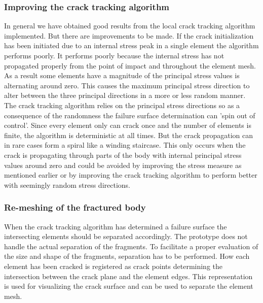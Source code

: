 \subsubsection*{Improving the crack tracking algorithm}
In general we have obtained good results from the local crack
tracking algorithm implemented. But there are improvements to be
made. If the crack initialization has been initiated due to an
internal stress peak in a single element the algorithm performs
poorly.
%
It performs poorly because the internal stress has not propagated
properly from the point of impact and throughout the element mesh.
As a result some elements have a magnitude of the principal stress values is
alternating around zero. This causes the maximum principal stress
direction to alter between the three principal directions in a more or
less random manner.
%
The crack tracking algorithm relies on the principal stress directions
so as a consequence of the randomness the failure surface
determination can 'spin out of control'. Since every element only can
crack once and the number of elements is finite, the algorithm is
deterministic at all times. But the crack propagation can in rare
cases form a spiral like a winding staircase. This only occurs when
the crack is propagating through parts of the body with internal
principal stress values around zero and could be avoided by improving
the stress measure as mentioned earlier or by improving the crack
tracking algorithm to perform better with seemingly random stress
directions.

\subsubsection*{Re-meshing of the fractured body}
When the crack tracking algorithm has determined a failure surface the
intersecting elements should be separated accordingly. The prototype
does not handle the actual separation of the fragments. To facilitate a
proper evaluation of the size and shape of the fragments, separation
has to be performed. How each element has been cracked is registered
as crack points determining the intersection between the crack plane
and the element edges. This representation is used for visualizing
the crack surface and can be used to separate the element mesh.

